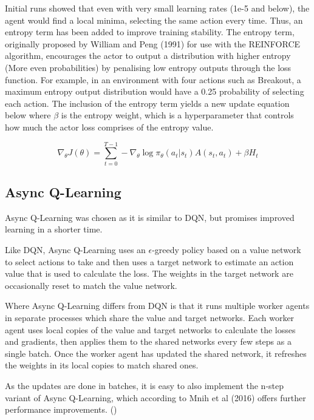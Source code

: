 \documentclass{article}
\begin{document}
Initial runs showed that even with very small learning rates (1e-5 and below), the agent would find a local minima, selecting the same action every time. Thus, an entropy term has been added to improve training stability. The entropy term, originally proposed by William and Peng (1991) for use with the REINFORCE algorithm, encourages the actor to output a distribution with higher entropy (More even probabilities) by penalising low entropy outputs through the loss function. For example, in an environment with four actions such as Breakout, a maximum entropy output distribution would have a 0.25 probability of selecting each action. The inclusion of the entropy term yields a new update equation below where  $\beta$ is the entropy weight, which is a hyperparameter that controls how much the actor loss comprises of the entropy value.

\begin{equation}
\nabla_{\theta} J(\theta) = \sum_{t=0}^{T-1}-\nabla_{\theta}\log{\pi_{\theta}}(a_{t} | s_{t}) A(s_{t}, a_{t}) + \beta H_{t}
\end{equation}

\subsection{Async Q-Learning}

Async Q-Learning was chosen as it is similar to DQN, but promises improved learning in a shorter time. 

Like DQN, Async Q-Learning uses an $\epsilon$-greedy policy based on a value network to select actions to take and then uses a target network to estimate an action value that is used to calculate the loss.
The weights in the target network are occasionally reset to match the value network.

Where Async Q-Learning differs from DQN is that it runs multiple worker agents in separate processes which share the value and target networks.
Each worker agent uses local copies of the value and target networks to calculate the losses and gradients, then applies them to the  shared networks every few steps as a single batch.
Once the worker agent has updated the shared network, it refreshes the weights in its local copies to match shared ones.

As the updates are done in batches, it is easy to also implement the n-step variant of Async Q-Learning, which according to Mnih et al (2016) offers further performance improvements. ()
\end{document}
